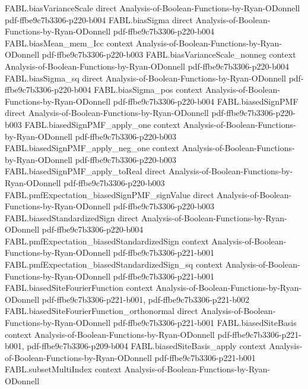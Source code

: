 \begin{theorem}
\proofstep
  {FABL.biasVarianceScale}
  {direct}
  {Analysis-of-Boolean-Functions-by-Ryan-ODonnell}
  {pdf-ffbe9c7b3306-p220-b004}
\proofstep
  {FABL.biasSigma}
  {direct}
  {Analysis-of-Boolean-Functions-by-Ryan-ODonnell}
  {pdf-ffbe9c7b3306-p220-b004}
\proofstep
  {FABL.biasMean_mem_Icc}
  {context}
  {Analysis-of-Boolean-Functions-by-Ryan-ODonnell}
  {pdf-ffbe9c7b3306-p220-b003}
\proofstep
  {FABL.biasVarianceScale_nonneg}
  {context}
  {Analysis-of-Boolean-Functions-by-Ryan-ODonnell}
  {pdf-ffbe9c7b3306-p220-b004}
\proofstep
  {FABL.biasSigma_sq}
  {direct}
  {Analysis-of-Boolean-Functions-by-Ryan-ODonnell}
  {pdf-ffbe9c7b3306-p220-b004}
\proofstep
  {FABL.biasSigma_pos}
  {context}
  {Analysis-of-Boolean-Functions-by-Ryan-ODonnell}
  {pdf-ffbe9c7b3306-p220-b004}
\proofstep
  {FABL.biasedSignPMF}
  {direct}
  {Analysis-of-Boolean-Functions-by-Ryan-ODonnell}
  {pdf-ffbe9c7b3306-p220-b003}
\proofstep
  {FABL.biasedSignPMF_apply_one}
  {context}
  {Analysis-of-Boolean-Functions-by-Ryan-ODonnell}
  {pdf-ffbe9c7b3306-p220-b003}
\proofstep
  {FABL.biasedSignPMF_apply_neg_one}
  {context}
  {Analysis-of-Boolean-Functions-by-Ryan-ODonnell}
  {pdf-ffbe9c7b3306-p220-b003}
\proofstep
  {FABL.biasedSignPMF_apply_toReal}
  {direct}
  {Analysis-of-Boolean-Functions-by-Ryan-ODonnell}
  {pdf-ffbe9c7b3306-p220-b003}
\proofstep
  {FABL.pmfExpectation_biasedSignPMF_signValue}
  {direct}
  {Analysis-of-Boolean-Functions-by-Ryan-ODonnell}
  {pdf-ffbe9c7b3306-p220-b003}
\proofstep
  {FABL.biasedStandardizedSign}
  {direct}
  {Analysis-of-Boolean-Functions-by-Ryan-ODonnell}
  {pdf-ffbe9c7b3306-p220-b004}
\proofstep
  {FABL.pmfExpectation_biasedStandardizedSign}
  {context}
  {Analysis-of-Boolean-Functions-by-Ryan-ODonnell}
  {pdf-ffbe9c7b3306-p221-b001}
\proofstep
  {FABL.pmfExpectation_biasedStandardizedSign_sq}
  {context}
  {Analysis-of-Boolean-Functions-by-Ryan-ODonnell}
  {pdf-ffbe9c7b3306-p221-b001}
\proofstep
  {FABL.biasedSiteFourierFunction}
  {context}
  {Analysis-of-Boolean-Functions-by-Ryan-ODonnell}
  {pdf-ffbe9c7b3306-p221-b001,
    pdf-ffbe9c7b3306-p221-b002}
\proofstep
  {FABL.biasedSiteFourierFunction_orthonormal}
  {direct}
  {Analysis-of-Boolean-Functions-by-Ryan-ODonnell}
  {pdf-ffbe9c7b3306-p221-b001}
\proofstep
  {FABL.biasedSiteBasis}
  {context}
  {Analysis-of-Boolean-Functions-by-Ryan-ODonnell}
  {pdf-ffbe9c7b3306-p221-b001,
    pdf-ffbe9c7b3306-p209-b004}
\proofstep
  {FABL.biasedSiteBasis_apply}
  {context}
  {Analysis-of-Boolean-Functions-by-Ryan-ODonnell}
  {pdf-ffbe9c7b3306-p221-b001}
\proofstep
  {FABL.subsetMultiIndex}
  {context}
  {Analysis-of-Boolean-Functions-by-Ryan-ODonnell}

\end{theorem}
